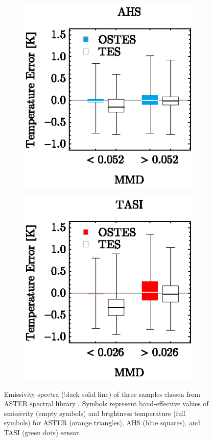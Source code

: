 \begin{figure}[!t]
\begin{subfigure}[t]{.3\linewidth}
		\caption{}
	\end{subfigure}
	\hspace{1em}
	\begin{subfigure}[t]{.3\linewidth}
		\centering
		\includegraphics[scale=1]{pics/Chapter_04/Simulated_data_AHS.eps}
		\vspace{-0.4cm}
		\caption{}
	\end{subfigure}
	\hspace{1em}
	\begin{subfigure}[t]{.3\linewidth}
		\centering
		\includegraphics[scale=1]{pics/Chapter_04/Simulated_data_TASI.eps}
		\vspace{-0.4cm}
		\caption{}
	\end{subfigure}
	\vspace{1.5 em}
	\caption{Emissivity spectra (black solid line) of three samples chosen from ASTER spectral library \cite{BH09}. Symbols represent band-effective values of emissivity (empty symbols) and brightness temperature (full symbols) for ASTER (orange triangles), AHS (blue squares), and TASI (green dots) sensor. }
	\label{fig:ResponseFunctions}
\end{figure}

